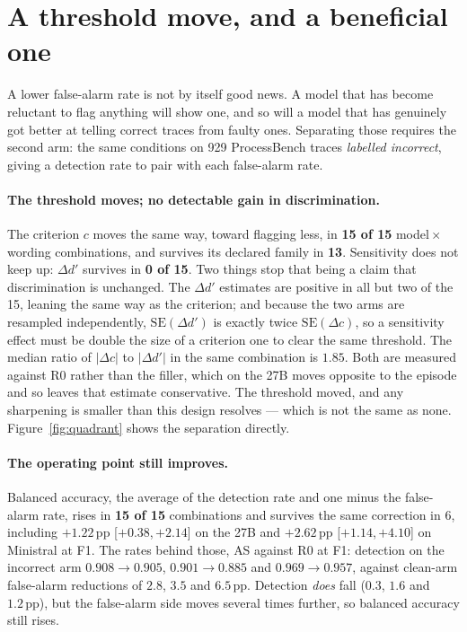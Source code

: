 \documentclass[11pt]{article}
\newcommand{\pp}{\,\text{pp}}
\newcommand{\ci}[2]{{\footnotesize[$#1$,\,$#2$]}}
\begin{document}
\section{A threshold move, and a beneficial one}
\label{sec:criterion}

A lower false-alarm rate is not by itself good news. A model that has become reluctant to flag anything
will show one, and so will a model that has genuinely got better at telling correct traces from faulty
ones. Separating those requires the second arm: the same conditions on 929 ProcessBench traces
\emph{labelled incorrect}, giving a detection rate to pair with each false-alarm rate.

\paragraph{The threshold moves; no detectable gain in discrimination.}
The criterion $c$ moves the same way, toward flagging less, in \textbf{15 of 15}
model\,$\times$\,wording combinations, and survives its declared family in \textbf{13}. Sensitivity
does not keep up: $\Delta d'$ survives in \textbf{0 of 15}. Two things stop that being a claim that
discrimination is unchanged. The $\Delta d'$ estimates are positive in all but two of the 15, leaning
the same way as the criterion; and because the two arms are resampled independently,
$\mathrm{SE}(\Delta d')$ is exactly twice $\mathrm{SE}(\Delta c)$, so a sensitivity effect must be
double the size of a criterion one to clear the same threshold. The median ratio of $|\Delta c|$ to
$|\Delta d'|$ in the same combination is $1.85$. Both are measured against R0 rather than the filler,
which on the 27B moves opposite to the episode and so leaves that estimate conservative. The threshold
moved, and any sharpening is smaller
than this design resolves --- which is not the same as none.
Figure~\ref{fig:quadrant} shows the separation directly.

\paragraph{The operating point still improves.}
Balanced accuracy, the average of the detection rate and one minus the false-alarm rate, rises in
\textbf{15 of 15} combinations and survives the same correction in 6, including $+1.22\pp$
\ci{+0.38}{+2.14} on the 27B and $+2.62\pp$ \ci{+1.14}{+4.10} on Ministral at F1. The rates behind
those, AS against R0 at F1: detection on the incorrect arm $0.908\!\rightarrow\!0.905$,
$0.901\!\rightarrow\!0.885$ and
$0.969\!\rightarrow\!0.957$, against clean-arm false-alarm reductions of $2.8$, $3.5$ and $6.5\pp$. Detection
\emph{does} fall ($0.3$, $1.6$ and $1.2\pp$), but the false-alarm side moves several times further, so
balanced accuracy still rises.
\end{document}
